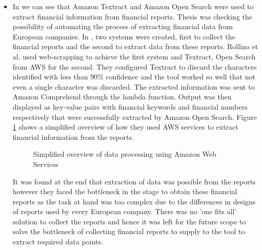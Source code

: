 \begin{itemize}
    \item In \cite{rollino2022automating} we can see that Amazon Textract and Amazon Open Search were used to extract financial information from financial reports. Thesis \cite{rollino2022automating} was checking the possibility of automating the process of extracting financial data from European companies. In \cite{rollino2022automating}, two systems were created, first to collect the financial reports and the second to extract data from these reports. Rollino et al. used web-scrapping to achieve the first system and Textract, Open Search from \acs{AWS} for the second. They configured Textract to discard the characters identified with less than 90\% confidence and the tool worked so well that not even a single character was discarded. The extracted information was sent to Amazon Comprehend through the lambda function. Output was then displayed as key-value pairs with financial keywords and financial numbers respectively that were successfully extracted by Amazon Open Search. Figure \ref{similar_work_arch} shows a simplified overview of how they used \acs{AWS} services to extract financial information from the reports.
    \begin {figure}[ht]
    \centering
    \caption{Simplified overview of data processing using Amazon Web Services}
    \label{similar_work_arch}
    \end {figure}
    It was found at the end that extraction of data was possible from the reports however they faced the bottleneck in the stage to obtain these financial reports as the task at hand was too complex due to the differences in designs of reports used by every European company. There was no 'one fits all' solution to collect the reports and hence it was left for the future scope to solve the bottleneck of collecting financial reports to supply to the tool to extract required data points.


\end{itemize}
